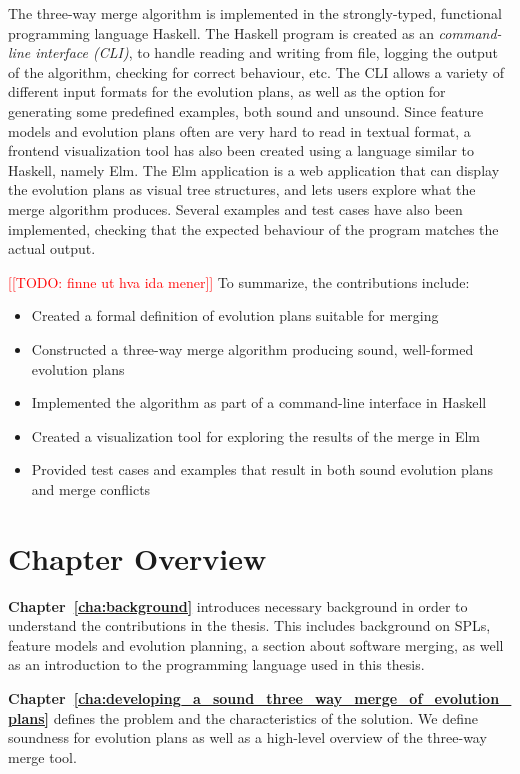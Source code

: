 \documentclass[a4paper,english]{ifimaster}
\newcommand{\todo}[1]{\textcolor{red}{[[TODO: #1]]}\PackageWarning{TODO:}{#1!}}
\begin{document}
The three-way merge algorithm is implemented in the strongly-typed, functional programming language Haskell. The Haskell program is created as an \textit{command-line interface (CLI)}, to handle reading and writing from file, logging the output of the algorithm, checking for correct behaviour, etc. The CLI allows a variety of different input formats for the evolution plans, as well as the option for generating some predefined examples, both sound and unsound. Since feature models and evolution plans often are very hard to read in textual format, a frontend visualization tool has also been created using a language similar to Haskell, namely Elm. The Elm application is a web application that can display the evolution plans as visual tree structures, and lets users explore what the merge algorithm produces. Several examples and test cases have also been implemented, checking that the expected behaviour of the program matches the actual output.

\todo{finne ut hva ida mener}
To summarize, the contributions include:

\begin{itemize}
  \item Created a formal definition of evolution plans suitable for merging
  \item Constructed a three-way merge algorithm producing sound, well-formed evolution plans
  \item Implemented the algorithm as part of a command-line interface in Haskell
  \item Created a visualization tool for exploring the results of the merge in Elm
  \item Provided test cases and examples that result in both sound evolution plans and merge conflicts
\end{itemize}

\section{Chapter Overview}%
\label{sec:chapter_overview}

\textbf{Chapter~\ref{cha:background}} introduces necessary background in order to understand the contributions in the thesis. This includes background on SPLs, feature models and evolution planning, a section about software merging, as well as an introduction to the programming language used in this thesis.

\textbf{Chapter~\ref{cha:developing_a_sound_three_way_merge_of_evolution_plans}} defines the problem and the characteristics of the solution. We define soundness for evolution plans as well as a high-level overview of the three-way merge tool.
\end{document}
